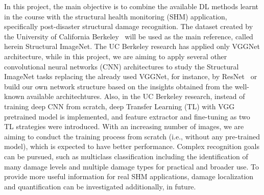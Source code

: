 \documentclass[10pt,twocolumn,letterpaper]{article}
\begin{document}
In this project, the main objective is to combine the available DL methods learnt in the course with the structural health monitoring (SHM) application, specifically post-disaster structural damage recognition. The dataset created by the University of California Berkeley~\cite{Imagenet01} will be used as the main reference, called herein Structural ImageNet. The UC Berkeley research has applied only VGGNet architecture, while in this project, we are aiming to apply several other convolutional neural networks (CNN) architectures to study the Structural ImageNet tasks replacing the already used VGGNet, for instance, by ResNet~\cite{He01} or build our own network structure based on the insights obtained from the well-known available architechtures. Also, in the UC Berkeley research, instead of training deep CNN from scratch, deep Transfer Learning (TL) with VGG pretrained model is implemented, and feature extractor and fine-tuning as two TL strategies were introduced. With an increasing number of images, we are aiming to conduct the training process from scratch (i.e., without any pre-trained model), which is expected to have better performance. Complex recognition goals can be pursued, such as multiclass classification including the identification of many damage levels and multiple damage types for practical and broader use. To provide more useful information for real SHM applications, damage localization and quantification can be investigated additionally, in future.
\end{document}
